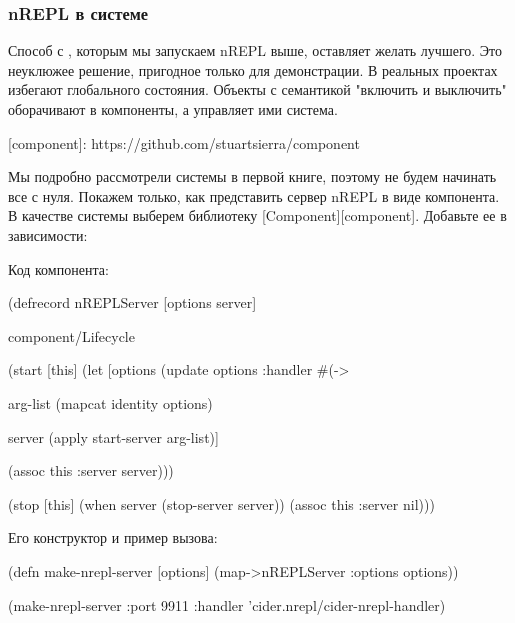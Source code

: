\subsubsection{nREPL в системе}

Способ с , которым мы запускаем nREPL выше, оставляет желать лучшего. Это неуклюжее решение, пригодное только для демонстрации. В реальных проектах избегают глобального состояния. Объекты с семантикой "включить и выключить" оборачивают в компоненты, а управляет ими система.

[component]: https://github.com/stuartsierra/component

Мы подробно рассмотрели системы в первой книге, поэтому не будем начинать все с нуля. Покажем только, как представить сервер nREPL в виде компонента. В качестве системы выберем библиотеку [Component][component]. Добавьте ее в зависимости:

\begin{english}
  \begin{clojure}
  \end{clojure}
\end{english}

Код компонента:

\begin{english}
  \begin{clojure}
(defrecord nREPLServer
    [options
     server]

  component/Lifecycle

  (start [this]
    (let [options
          (update options :handler #(-> %

          arg-list
          (mapcat identity options)

          server
          (apply start-server arg-list)]

      (assoc this :server server)))

  (stop [this]
    (when server
      (stop-server server))
    (assoc this :server nil)))
  \end{clojure}
\end{english}

Его конструктор и пример вызова:

\begin{english}
  \begin{clojure}
(defn make-nrepl-server [options]
  (map->nREPLServer {:options options}))

(make-nrepl-server
 {:port 9911
  :handler 'cider.nrepl/cider-nrepl-handler})
  \end{clojure}
\end{english}

